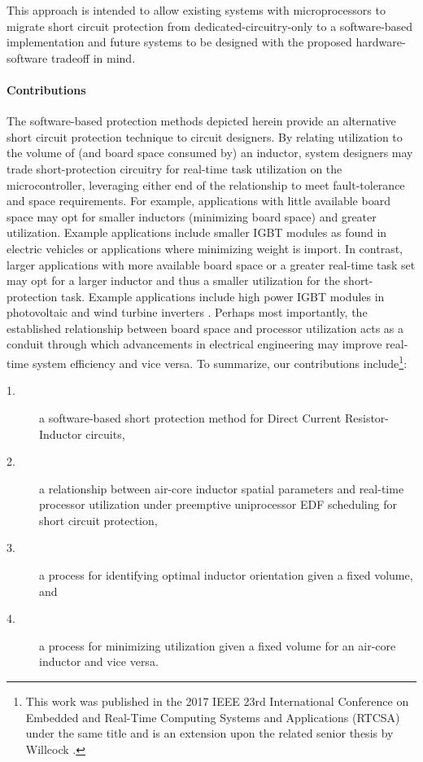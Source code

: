 This approach is intended to allow existing systems with microprocessors to migrate short circuit protection from dedicated-circuitry-only to a software-based implementation and future systems to be designed with the proposed hardware-software tradeoff in mind.

\paragraph{Contributions}
The software-based protection methods depicted herein provide an alternative short circuit protection technique to circuit designers.
By relating utilization to the volume of (and board space consumed by) an inductor, system designers may trade short-protection circuitry for real-time task utilization on the microcontroller, leveraging either end of the relationship to meet fault-tolerance and space requirements.
For example, applications with little available board space may opt for smaller inductors (minimizing board space) and greater utilization.
Example applications include smaller IGBT modules as found in electric vehicles or applications where minimizing weight is import\cite{ji_situ_2013}.
In contrast, larger applications with more available board space or a greater real-time task set may opt for a larger inductor and thus a smaller utilization for the short-protection task.
Example applications include high power IGBT modules in photovoltaic and wind turbine inverters \cite{zhang_model-based_2011}\cite{busca_overview_2011}.
Perhaps most importantly, the established relationship between board space and processor utilization acts as a conduit through which advancements in electrical engineering may improve real-time system efficiency and vice versa.
To summarize, our contributions include\footnote{This work was published in the 2017 IEEE 23rd International Conference on Embedded and Real-Time Computing Systems and Applications (RTCSA) under the same title \cite{willcock_trading_2017} and is an extension upon the related senior thesis by Willcock \cite{willcock_short_2016}.}:%
\begin{description}
\item [1.] a software-based short protection method for Direct Current Resistor-Inductor circuits,
\item [2.] a relationship between air-core inductor spatial parameters and real-time processor utilization under preemptive uniprocessor EDF scheduling for short circuit protection,
\item [3.] a process for identifying optimal inductor orientation given a fixed volume, and
\item [4.] a process for minimizing utilization given a fixed volume for an air-core inductor and vice versa.
\end{description}


